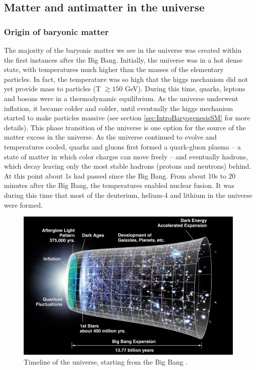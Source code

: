 \subsection{Matter and antimatter in the universe}


\subsubsection{Origin of baryonic matter}
The majority of the baryonic matter we see in the universe was created within the first instances after the Big Bang. Initially, the universe was in a hot dense state, with temperatures much higher than the masses of the elementary particles. In fact, the temperature was so high that the higgs mechanism did not yet provide mass to particles\cite{Higgs_vev_highT} (T $\gtrsim 150$ GeV). During this time, quarks, leptons and bosons were in a thermodynamic equilibrium. As the universe underwent inflation, it became colder and colder, until eventually the higgs mechanism started to make particles massive\cite{Higgs_vev_highT} (see section \ref{sec:IntroBaryogenesisSM} for more details). This phase transition of the universe is one option for the source of the matter excess in the universe.
As the universe continued to evolve and temperatures cooled, quarks and gluons first formed a quark-gluon plasma -- a state of matter in which color charges can move freely\cite{} --  and eventually hadrons, which decay leaving only the most stable hadrons (protons and neutrons) behind. At this point about 1s had passed since the Big Bang. From about 10s to 20 minutes after the Big Bang, the temperatures enabled nuclear fusion. It was during this time that most of the deuterium, helium-4 and lithium in the universe were formed. \\

\begin{figure}
    \centering
    \includegraphics[width=\textwidth]{figures/CMB_Timeline300_no_WMAP.jpg}
    \caption{Timeline of the universe, starting from the Big Bang \cite{timelineOfTheUniverse}.}
    \label{fig:TimelineOfTheUniverse}
\end{figure}

